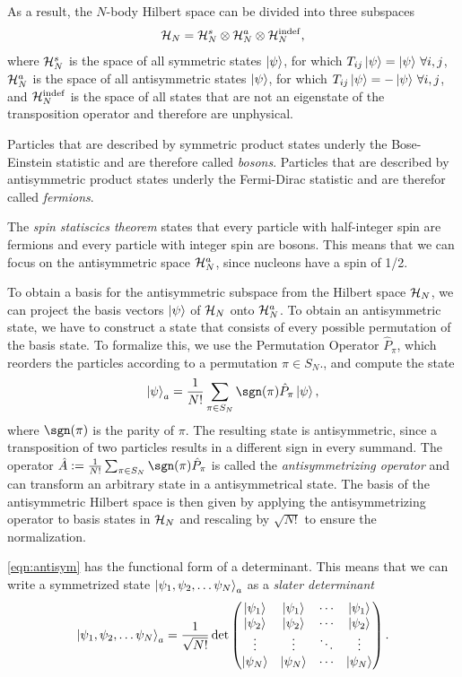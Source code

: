 As a result, the $N$-body Hilbert space can be divided into three subspaces
\begin{equation}
  \mathcal{H}_N = \mathcal{H}_N^s \otimes \mathcal{H}_N^a \otimes \mathcal{H}_N^{\mathrm{indef}},
\end{equation}
where $\mathcal{H}_N^s$ is the space of all symmetric states $\ket\psi$, for which $T_{ij}\ket\psi = \ket\psi\, \forall i,j$, $\mathcal{H}_N^a$ is the space of all antisymmetric states $\ket\psi$, for which $T_{ij}\ket\psi = -\ket\psi\, \forall i,j$, and $\mathcal{H}_N^{\mathrm{indef}}$ is the space of all states that are not an eigenstate of the transposition operator and therefore are unphysical.

Particles that are described by symmetric product states underly the Bose-Einstein statistic and are therefore called \textit{bosons}. Particles that are described by antisymmetric product states underly the Fermi-Dirac statistic and are therefor called \textit{fermions}.

The \textit{spin statiscics theorem} states that every particle with half-integer spin are fermions and every particle with integer spin are bosons. This means that we can focus on the antisymmetric space $\mathcal{H}_N^a$, since nucleons have a spin of 1/2.

To obtain a basis for the antisymmetric subspace from the Hilbert space $\mathcal{H}_N$, we can project the basis vectors $\ket\psi$ of $\mathcal{H}_N$ onto $\mathcal{H}_N^a$. To obtain an antisymmetric state, we have to construct a state that consists of every possible permutation of the basis state. To formalize this, we use the Permutation Operator $\hat{P}_\pi$, which reorders the particles according to a permutation $\pi \in S_N$., and compute the state
\begin{equation}
  \label{eqn:antisym}
  \ket{\psi}_a = \frac{1}{N!} \sum_{\pi \in S_N} \sgn(\pi) \hat{P}_\pi \ket\psi,
\end{equation}
where $\sgn(\pi)$ is the parity of $\pi$.
The resulting state is antisymmetric, since a transposition of two particles results in a different sign in every summand. The operator $\hat{A} := \frac{1}{N!}\sum_{\pi \in S_N} \sgn(\pi) \hat{P}_\pi$ is called the \textit{antisymmetrizing operator} and can transform an arbitrary state in a antisymmetrical state.
The basis of the antisymmetric Hilbert space is then given by applying the antisymmetrizing operator to basis states in $\mathcal{H}_N$ and rescaling by $\sqrt{N!}$ to ensure the normalization.

\eqref{eqn:antisym} has the functional form of a determinant. This means that we can write a symmetrized state $\ket{\psi_1, \psi_2,  \dots \psi_N}_a$ as a \textit{slater determinant}
\begin{equation}
  \ket{\psi_1, \psi_2,  \dots \psi_N}_a = \frac{1}{\sqrt{N!}}\det
  \begin{pmatrix}
    \ket{\psi_1} & \ket{\psi_1} & \cdots & \ket{\psi_1} \\
    \ket{\psi_2} & \ket{\psi_2} & \cdots & \ket{\psi_2} \\
    \vdots       & \vdots       & \ddots & \vdots       \\
    \ket{\psi_N} & \ket{\psi_N} & \cdots & \ket{\psi_N} \\
  \end{pmatrix}.
\end{equation}
